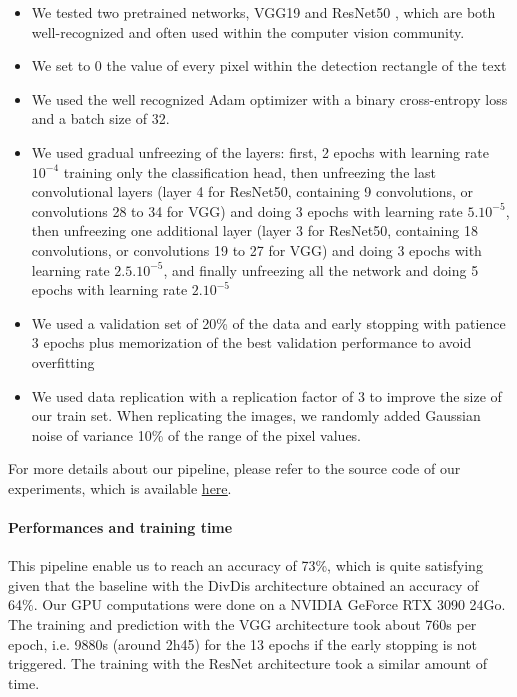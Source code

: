 \documentclass[sigconf, nonacm]{acmart}
\begin{document}
\begin{itemize}
    \item We tested two pretrained networks, VGG19 \cite{simonyan_very_2015} and ResNet50 \cite{he_deep_2015}, which are both well-recognized and often used within the computer vision community.
    \item We set to 0 the value of every pixel within the detection rectangle of the text
    \item We used the well recognized Adam optimizer \cite{kingma_adam_2017} with a binary cross-entropy loss and a batch size of 32.
    \item We used gradual unfreezing of the layers: first, 2 epochs with learning rate $10^{-4}$ training only the classification head, then unfreezing the last convolutional layers (layer 4 for ResNet50, containing 9 convolutions, or convolutions 28 to 34 for VGG) and doing 3 epochs with learning rate $5.10^{-5}$, then unfreezing one additional layer (layer 3 for ResNet50, containing 18 convolutions, or convolutions 19 to 27 for VGG) and doing 3 epochs with learning rate $2.5.10^{-5}$, and finally unfreezing all the network and doing 5 epochs with learning rate $2.10^{-5}$
    \item We used a validation set of 20\% of the data and early stopping with patience 3 epochs plus memorization of the best validation performance to avoid overfitting
    \item We used data replication with a replication factor of 3 to improve the size of our train set. When replicating the images, we randomly added Gaussian noise of variance 10\% of the range of the pixel values.
\end{itemize}

For more details about our pipeline, please refer to the source code of our experiments, which is available \href{https://github.com/DentanJeremie/age-underspecification}{\underline{here}}.

\paragraph{Performances and training time} This pipeline enable us to reach an accuracy of 73\%, which is quite satisfying given that the baseline with the DivDis architecture \cite{lee_diversify_2022} obtained an accuracy of 64\%. Our GPU computations were done on a NVIDIA GeForce RTX 3090 24Go. The training and prediction with the VGG architecture took about 760s per epoch, i.e. 9880s (around 2h45) for the 13 epochs if the early stopping is not triggered. The training with the ResNet architecture took a similar amount of time.
\end{document}
